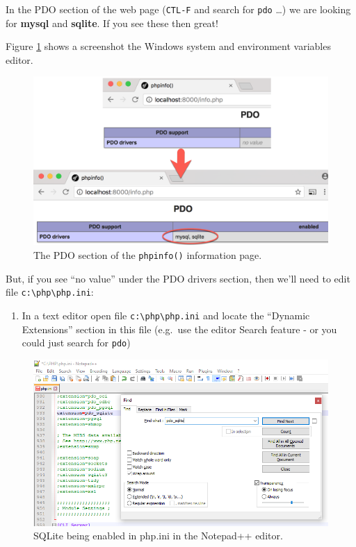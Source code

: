 \documentclass[a4paperpaper,openright]{book}
\providecommand{\tightlist}{%
  \setlength{\itemsep}{0pt}\setlength{\parskip}{0pt}}
\begin{document}
In the PDO section of the web page (\texttt{CTL-F} and search for
\texttt{pdo} \ldots{}) we are looking for \textbf{mysql} and
\textbf{sqlite}. If you see these then great!

Figure \ref{info} shows a screenshot the Windows system and environment
variables editor.

\begin{figure}
\centering
\includegraphics{./tex2pdf.-56818c273b0f887e/23f96bdd9781fe840d266ef37cf21f53375d2ee1.png}
\caption{The PDO section of the \texttt{phpinfo()} information page.
\label{info}}
\end{figure}

But, if you see ``no value'' under the PDO drivers section, then we'll
need to edit file \texttt{c:\textbackslash{}php\textbackslash{}php.ini}:

\begin{enumerate}
\def\labelenumi{\arabic{enumi}.}
\tightlist
\item
  In a text editor open file
  \texttt{c:\textbackslash{}php\textbackslash{}php.ini} and locate the
  ``Dynamic Extensions'' section in this file (e.g.~use the editor
  Search feature - or you could just search for \texttt{pdo})
\end{enumerate}

\begin{figure}
\centering
\includegraphics{./tex2pdf.-56818c273b0f887e/1d5fcbd6fa656ccd94d4e29a62daf0a1df5dae28.png}
\caption{SQLite being enabled in php.ini in the Notepad++ editor.}
\end{figure}
\end{document}
